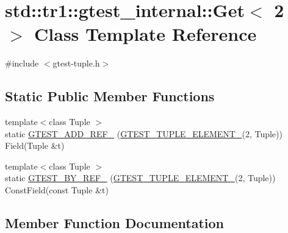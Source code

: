 \hypertarget{classstd_1_1tr1_1_1gtest__internal_1_1Get_3_012_01_4}{}\section{std\+::tr1\+::gtest\+\_\+internal\+::Get$<$ 2 $>$ Class Template Reference}
\label{classstd_1_1tr1_1_1gtest__internal_1_1Get_3_012_01_4}


{\ttfamily \#include $<$gtest-\/tuple.\+h$>$}

\subsection*{Static Public Member Functions}
\begin{DoxyCompactItemize}
\item 
{\footnotesize template$<$class Tuple $>$ }\\static \mbox{\hyperlink{classstd_1_1tr1_1_1gtest__internal_1_1Get_3_012_01_4_a8dfe7b5c1c915f10181e3fb5952ba6d8}{G\+T\+E\+S\+T\+\_\+\+A\+D\+D\+\_\+\+R\+E\+F\+\_\+}} (\mbox{\hyperlink{gtest-tuple_8h_a1b7f133d8aa02e0b7afed7b66781eeb7}{G\+T\+E\+S\+T\+\_\+\+T\+U\+P\+L\+E\+\_\+\+E\+L\+E\+M\+E\+N\+T\+\_\+}}(2, Tuple)) Field(Tuple \&t)
\item 
{\footnotesize template$<$class Tuple $>$ }\\static \mbox{\hyperlink{classstd_1_1tr1_1_1gtest__internal_1_1Get_3_012_01_4_a76127c9c03c1f0caa61fb87d4d756b5b}{G\+T\+E\+S\+T\+\_\+\+B\+Y\+\_\+\+R\+E\+F\+\_\+}} (\mbox{\hyperlink{gtest-tuple_8h_a1b7f133d8aa02e0b7afed7b66781eeb7}{G\+T\+E\+S\+T\+\_\+\+T\+U\+P\+L\+E\+\_\+\+E\+L\+E\+M\+E\+N\+T\+\_\+}}(2, Tuple)) Const\+Field(const Tuple \&t)
\end{DoxyCompactItemize}


\subsection{Member Function Documentation}
\mbox{\label{classstd_1_1tr1_1_1gtest__internal_1_1Get_3_012_01_4_a8dfe7b5c1c915f10181e3fb5952ba6d8}} 
